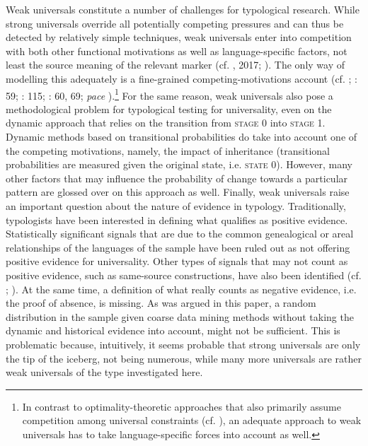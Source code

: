\documentclass[output=paper]{langsci/langscibook}
\begin{document}
Weak universals constitute a number of challenges for typological research. While strong universals override all potentially competing pressures and can thus be detected by relatively simple techniques, weak universals enter into competition with both other functional motivations as well as language-specific factors, not least the source meaning of the relevant marker (cf. \citealt{Cristofaro2012}, 2017; \citealt{Hammarström2015}). The only way of modelling this adequately is a fine-grained competing-motivations account (cf. \citealt{Haiman1983}; \citealt{DuBois1985,Croft2003}: 59; \citealt{Bickel2014}: 115; \citealt{Hawkins2014_CompMot}: 60, 69; \textit{pace} ).\footnote{In contrast to optimality-theoretic approaches that also primarily assume competition among universal constraints (cf. \citealt{Aissen2003}), an adequate approach to weak universals has to take language-specific forces into account as well.} For the same reason, weak universals also pose a methodological problem for typological testing for universality, even on the dynamic approach that relies on the transition from \textsc{stage} 0 into \textsc{stage} 1. Dynamic methods based on transitional probabilities do take into account one of the competing motivations, namely, the impact of inheritance (transitional probabilities are measured given the original state, i.e. \textsc{state 0}). However, many other factors that may influence the probability of change towards a particular pattern are glossed over on this approach as well. Finally, weak universals raise an important question about the nature of evidence in typology. Traditionally, typologists have been interested in defining what qualifies as positive evidence. Statistically significant signals that are due to the common genealogical or areal relationships of the languages of the sample have been ruled out as not offering positive evidence for universality. Other types of signals that may not count as positive evidence, such as same-source constructions, have also been identified (cf. \citealt{Cristofaro2017}; ). At the same time, a definition of what really counts as negative evidence, i.e. the proof of absence, is missing. As was argued in this paper, a random distribution in the sample given coarse data mining methods without taking the dynamic and historical evidence into account, might not be sufficient. This is problematic because, intuitively, it seems probable that strong universals are only the tip of the iceberg, not being numerous, while many more universals are rather weak universals of the type investigated here. 
\end{document}
